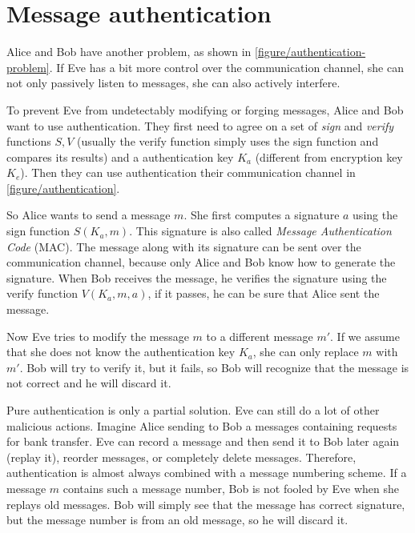 \section{Message authentication}
\label{toc/message-authentication}




Alice and Bob have another problem, as shown in \autoref{figure/authentication-problem}. If Eve has a bit more control over the communication channel, she can not only passively listen to messages, she can also actively interfere.

To prevent Eve from undetectably modifying or forging messages, Alice and Bob want to use authentication. They first need to agree on a set of \textit{sign} and \textit{verify} functions $S, V$ (usually the verify function simply uses the sign function and compares its results) and a authentication key $K_a$ (different from encryption key $K_e$). Then they can use authentication their communication channel in \autoref{figure/authentication}.

So Alice wants to send a message $m$. She first computes a signature $a$ using the sign function $S(K_a, m)$. This signature is also called \textit{Message Authentication Code} (MAC). The message along with its signature can be sent over the communication channel, because only Alice and Bob know how to generate the signature. When Bob receives the message, he verifies the signature using the verify function $V(K_a, m, a)$, if it passes, he can be sure that Alice sent the message.

Now Eve tries to modify the message $m$ to a different message $m'$. If we assume that she does not know the authentication key $K_a$, she can only replace $m$ with $m'$. Bob will try to verify it, but it fails, so Bob will recognize that the message is not correct and he will discard it.

Pure authentication is only a partial solution. Eve can still do a lot of other malicious actions. Imagine Alice sending to Bob a messages containing requests for bank transfer. Eve can record a message and then send it to Bob later again (replay it), reorder messages, or completely delete messages. Therefore, authentication is almost always combined with a message numbering scheme. If a message $m$ contains such a message number, Bob is not fooled by Eve when she replays old messages. Bob will simply see that the message has correct signature, but the message number is from an old message, so he will discard it.

